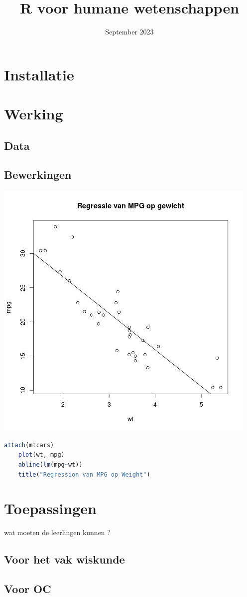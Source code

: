 \documentclass[a4paper,12pt, dutch, oneside ]{book}
\begin{document}
\title{R voor humane wetenschappen}
\date{September 2023}

\maketitle
\tableofcontents

\chapter{Installatie}

%

\chapter{Werking}


\section{Data}

\section{Bewerkingen}
\includegraphics[scale=.5]{ren.jpeg}
\begin{lstlisting}[language=R]
    attach(mtcars)
    plot(wt, mpg)
    abline(lm(mpg~wt))
    title("Regression van MPG op Weight")
\end{lstlisting}


\chapter{Toepassingen}

wat moeten de leerlingen kunnen ?

\section{Voor het vak wiskunde}
\section{Voor OC}
\end{document}
